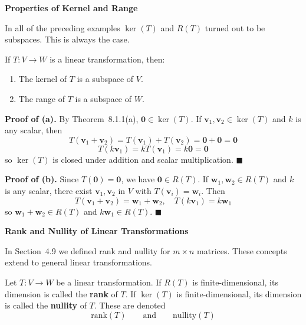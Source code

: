 \documentclass{article}
\newcommand{\redheading}[1]{{\vspace{2mm}\noindent\Large\bfseries\color{red!55!black} #1\par}\vspace{2mm}}
\begin{document}
\vspace{2mm}

\redheading{Properties of Kernel and Range}

In all of the preceding examples $\ker(T)$ and $R(T)$ turned out to be subspaces.
This is always the case.

\begin{tcolorbox}[colback=red!4, colframe=red!60!black,
  title={\textbf{Theorem 8.1.3}}, boxrule=0.5mm, arc=3mm]
If $T : V \to W$ is a linear transformation, then:
\begin{enumerate}
  \item[(a)] The kernel of $T$ is a subspace of $V$.
  \item[(b)] The range of $T$ is a subspace of $W$.
\end{enumerate}
\end{tcolorbox}

\medskip
\textbf{Proof of (a).} By Theorem~8.1.1(a), $\mathbf{0} \in \ker(T)$. If $\mathbf{v}_1,\mathbf{v}_2
\in \ker(T)$ and $k$ is any scalar, then
\[
  T(\mathbf{v}_1+\mathbf{v}_2) = T(\mathbf{v}_1)+T(\mathbf{v}_2) = \mathbf{0}+\mathbf{0} = \mathbf{0}
\]
\[
  T(k\mathbf{v}_1) = kT(\mathbf{v}_1) = k\mathbf{0} = \mathbf{0}
\]
so $\ker(T)$ is closed under addition and scalar multiplication. $\blacksquare$

\medskip
\textbf{Proof of (b).} Since $T(\mathbf{0})=\mathbf{0}$, we have $\mathbf{0}\in R(T)$.
If $\mathbf{w}_1,\mathbf{w}_2\in R(T)$ and $k$ is any scalar, there exist $\mathbf{v}_1,\mathbf{v}_2$
in $V$ with $T(\mathbf{v}_i)=\mathbf{w}_i$. Then
\[
  T(\mathbf{v}_1+\mathbf{v}_2) = \mathbf{w}_1+\mathbf{w}_2, \quad T(k\mathbf{v}_1) = k\mathbf{w}_1
\]
so $\mathbf{w}_1+\mathbf{w}_2 \in R(T)$ and $k\mathbf{w}_1 \in R(T)$. $\blacksquare$

\vspace{2mm}

\redheading{Rank and Nullity of Linear Transformations}

In Section~4.9 we defined rank and nullity for $m\times n$ matrices. These concepts extend
to general linear transformations.

\begin{tcolorbox}[colback=teal!4, colframe=teal!65!black,
  title={\textbf{Definition 3}}, boxrule=0.5mm, arc=3mm]
Let $T : V \to W$ be a linear transformation. If $R(T)$ is finite-dimensional, its
dimension is called the \textbf{rank} of $T$. If $\ker(T)$ is finite-dimensional, its
dimension is called the \textbf{nullity} of $T$. These are denoted
\[
  \text{rank}(T) \qquad \text{and} \qquad \text{nullity}(T)
\]
\end{tcolorbox}
\end{document}

